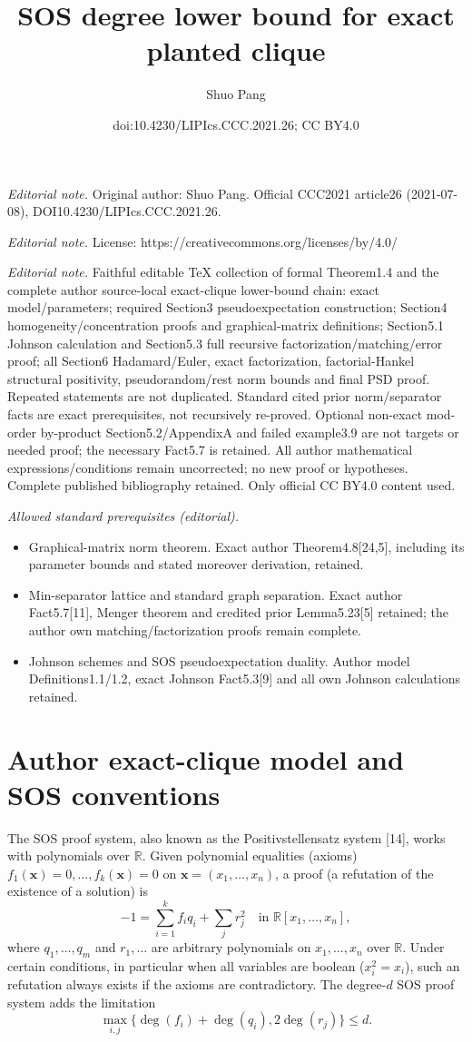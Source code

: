 \documentclass[10pt,a4paper]{article}
\title{SOS degree lower bound for exact planted clique}
\author{Shuo Pang}
\date{doi:10.4230/LIPIcs.CCC.2021.26; CC BY4.0}
\begin{document}
\maketitle
\noindent\textit{Editorial note.} Original author: Shuo Pang. Official CCC2021 article26 (2021-07-08), DOI10.4230/LIPIcs.CCC.2021.26.\par\medskip
\noindent\textit{Editorial note.} License: https://creativecommons.org/licenses/by/4.0/\par\medskip
\noindent\textit{Editorial note.} Faithful editable TeX collection of formal Theorem1.4 and the complete author source-local exact-clique lower-bound chain: exact model/parameters; required Section3 pseudoexpectation construction; Section4 homogeneity/concentration proofs and graphical-matrix definitions; Section5.1 Johnson calculation and Section5.3 full recursive factorization/matching/error proof; all Section6 Hadamard/Euler, exact factorization, factorial-Hankel structural positivity, pseudorandom/rest norm bounds and final PSD proof. Repeated statements are not duplicated. Standard cited prior norm/separator facts are exact prerequisites, not recursively re-proved. Optional non-exact mod-order by-product Section5.2/AppendixA and failed example3.9 are not targets or needed proof; the necessary Fact5.7 is retained. All author mathematical expressions/conditions remain uncorrected; no new proof or hypotheses. Complete published bibliography retained. Only official CC BY4.0 content used.\par\medskip
\noindent\textit{Allowed standard prerequisites (editorial).}\begin{itemize}
\item Graphical-matrix norm theorem. Exact author Theorem4.8[24,5], including its parameter bounds and stated moreover derivation, retained.
\item Min-separator lattice and standard graph separation. Exact author Fact5.7[11], Menger theorem and credited prior Lemma5.23[5] retained; the author own matching/factorization proofs remain complete.
\item Johnson schemes and SOS pseudoexpectation duality. Author model Definitions1.1/1.2, exact Johnson Fact5.3[9] and all own Johnson calculations retained.
\end{itemize}\medskip
\section*{Author exact-clique model and SOS conventions}
The SOS proof system, also known as the Positivstellensatz system [14], works with polynomials over $\mathbb R$. Given polynomial equalities (axioms) $f_1(\mathbf x)=0,\ldots,f_k(\mathbf x)=0$ on $\mathbf x=(x_1,\ldots,x_n)$, a proof (a refutation of the existence of a solution) is
\[-1=\sum_{i=1}^kf_iq_i+\sum_jr_j^2\quad\text{in }\mathbb R[x_1,\ldots,x_n],\]
where $q_1,\ldots,q_m$ and $r_1,\ldots$ are arbitrary polynomials on $x_1,\ldots,x_n$ over $\mathbb R$. Under certain conditions, in particular when all variables are boolean ($x_i^2=x_i$), such an refutation always exists if the axioms are contradictory. The degree-$d$ SOS proof system adds the limitation
\[\max_{i,j}\{\deg(f_i)+\deg(q_i),2\deg(r_j)\}\le d.\]
\end{document}
